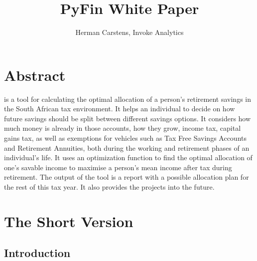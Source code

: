 \documentclass[a4paper, justified]{tufte-handout}
\title{PyFin White Paper}
\author[]{Herman Carstens, Invoke Analytics}
\newcommand{\blankpage}{\newpage\hbox{}\thispagestyle{empty}\newpage}
\begin{document}



\maketitle


\begin{fullwidth}

\setlength{\parindent}{0pt}



\end{fullwidth}








\section{Abstract} \label{ch:intro}
 is a tool for calculating the optimal allocation of a person's retirement savings in the South African tax environment. It helps an individual to decide on how future savings should be split between different savings options. It considers how much money is already in those accounts, how they grow, income tax, capital gains tax, as well as exemptions for vehicles such as Tax Free Savings Accounts and Retirement Annuities, both during the working and retirement phases of an individual's life. It uses an optimization function to find the optimal allocation of one's savable income to maximise a person's mean income after tax during retirement. The output of the tool is a report with a possible allocation plan for the rest of this tax year. It also provides the projects into the future.

\section{The Short Version}
\subsection{Introduction}
\end{document}
